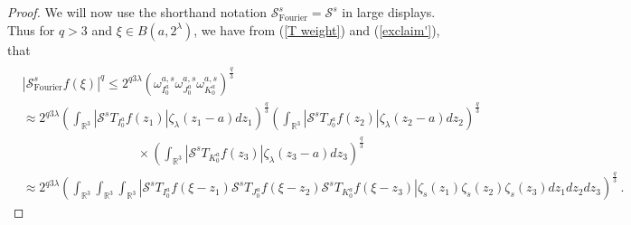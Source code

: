 \documentclass{amsart}%
\theoremstyle{plain}
\numberwithin{equation}{section}
\begin{document}
\begin{proof}
We will now use the shorthand notation $\mathcal{S}_{\operatorname*{Fourier}%
}^{s}=\mathcal{S}^{s}$ in large displays. Thus for $q>3$ and $\xi\in B\left(
a,2^{\lambda}\right)  $, we have from (\ref{T weight}) and (\ref{exclaim'}),
that%
\begin{align}
& \label{S inequ}\\
&  \left\vert \mathcal{S}_{\operatorname*{Fourier}}^{s}f\left(  \xi\right)
\right\vert ^{q}\leq2^{q3\lambda}\left(  \omega_{I_{0}^{a}}^{a,s}\omega
_{J_{0}^{a}}^{a,s}\omega_{K_{0}^{a}}^{a,s}\right)  ^{\frac{q}{3}}\nonumber\\
&  \approx2^{q3\lambda}\left(  \int_{\mathbb{R}^{3}}\left\vert \mathcal{S}%
^{s}T_{I_{0}^{a}}f\left(  z_{1}\right)  \right\vert \zeta_{\lambda}\left(
z_{1}-a\right)  dz_{1}\right)  ^{\frac{q}{3}}\left(  \int_{\mathbb{R}^{3}%
}\left\vert \mathcal{S}^{s}T_{J_{0}^{a}}f\left(  z_{2}\right)  \right\vert
\zeta_{\lambda}\left(  z_{2}-a\right)  dz_{2}\right)  ^{\frac{q}{3}%
}\nonumber\\
&
\ \ \ \ \ \ \ \ \ \ \ \ \ \ \ \ \ \ \ \ \ \ \ \ \ \ \ \ \ \ \ \ \ \ \ \ \ \ \ \ \ \times
\left(  \int_{\mathbb{R}^{3}}\left\vert \mathcal{S}^{s}T_{K_{0}^{a}}f\left(
z_{3}\right)  \right\vert \zeta_{\lambda}\left(  z_{3}-a\right)
dz_{3}\right)  ^{\frac{q}{3}}\nonumber\\
&  \approx2^{q3\lambda}\left(  \int_{\mathbb{R}^{3}}\int_{\mathbb{R}^{3}}%
\int_{\mathbb{R}^{3}}\left\vert \mathcal{S}^{s}T_{I_{0}^{a}}f\left(  \xi
-z_{1}\right)  \mathcal{S}^{s}T_{J_{0}^{a}}f\left(  \xi-z_{2}\right)
\mathcal{S}^{s}T_{K_{0}^{a}}f\left(  \xi-z_{3}\right)  \right\vert \zeta
_{s}\left(  z_{1}\right)  \zeta_{s}\left(  z_{2}\right)  \zeta_{s}\left(
z_{3}\right)  dz_{1}dz_{2}dz_{3}\right)  ^{\frac{q}{3}}\ .\nonumber
\end{align}



\end{proof}
\end{document}
